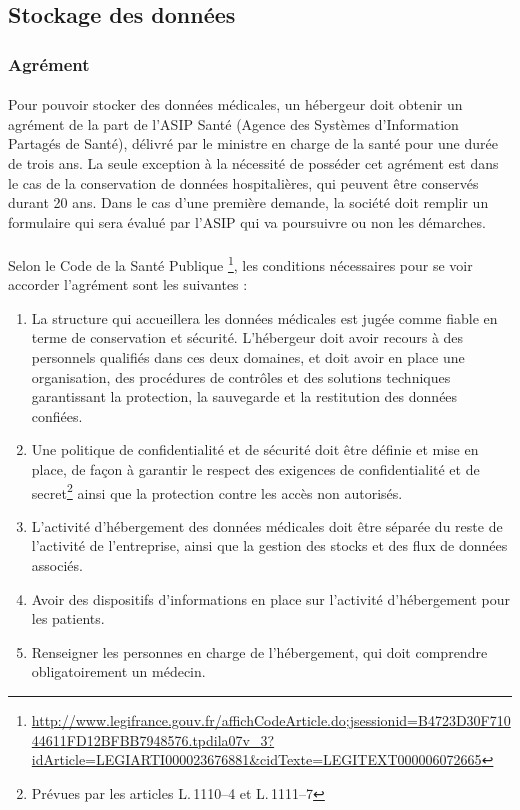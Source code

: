         \subsection{Stockage des données}
        \subsubsection{Agrément}

\paragraph{}
Pour pouvoir stocker des données médicales, un hébergeur doit obtenir un
agrément de la part de l'ASIP Santé (Agence des Systèmes d'Information Partagés
de Santé), délivré par le ministre en charge de la santé pour une durée de
trois ans. La seule exception à la nécessité de posséder cet agrément est dans
le cas de la conservation de données hospitalières, qui peuvent être conservés
durant 20 ans. Dans le cas d'une première demande, la société doit remplir un
formulaire qui sera évalué par l'ASIP qui va poursuivre ou non les démarches.

\paragraph{}
Selon
le Code de la Santé Publique \footnote{\url{http://www.legifrance.gouv.fr/affichCodeArticle.do;jsessionid=B4723D30F71044611FD12BFBB7948576.tpdila07v_3?idArticle=LEGIARTI000023676881&cidTexte=LEGITEXT000006072665}},
les conditions nécessaires pour se voir accorder
l'agrément sont les suivantes :
\begin{enumerate}
    \item La structure qui accueillera les données médicales est jugée comme
        fiable en terme de conservation et sécurité. L'hébergeur doit avoir
        recours à des personnels qualifiés dans ces deux domaines, et doit
        avoir en place une organisation, des procédures de contrôles et des
        solutions techniques garantissant la protection, la sauvegarde et la
        restitution des données confiées.
    \item Une politique de confidentialité et de sécurité doit être définie et
        mise en place, de façon à garantir le respect des exigences de
        confidentialité et de secret\footnote{Prévues par les articles
        L.\,1110--4 et L.\,1111--7} ainsi que la protection contre les accès
        non autorisés.
    \item L'activité d'hébergement des données médicales doit être séparée du
        reste de l'activité de l'entreprise, ainsi que la gestion des stocks et
        des flux de données associés.
    \item Avoir des dispositifs d'informations en place sur l'activité
        d'hébergement pour les patients.
    \item Renseigner les personnes en charge de l'hébergement, qui doit
        comprendre obligatoirement un médecin.
\end{enumerate}

